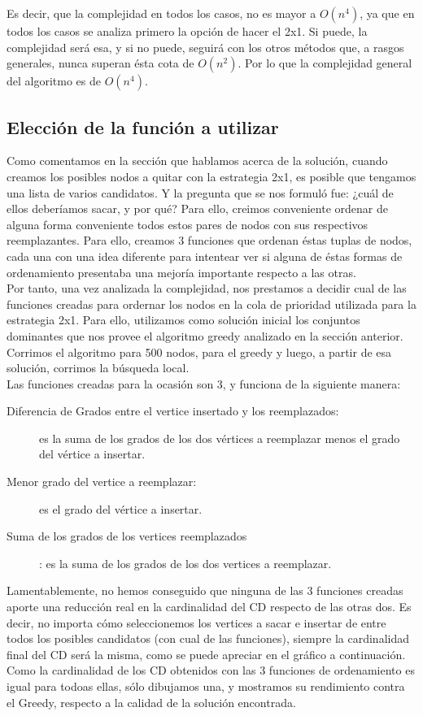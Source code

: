  Es decir, que la complejidad en todos los casos, no es mayor a $O(n^4)$, ya que en todos los casos se analiza primero la opción de hacer el 2x1. Si puede, la complejidad será esa, y si no puede, seguirá con los otros métodos que, a rasgos generales, nunca superan ésta cota de $O(n^2)$. Por lo que la complejidad general del algoritmo es de \textbf{$O(n^4)$}.
 
 \subsection{Elección de la función a utilizar}
Como comentamos en la sección que hablamos acerca de la solución, cuando creamos los posibles nodos a quitar con la estrategia 2x1, es posible que tengamos una lista de varios candidatos. Y la pregunta que se nos formuló fue: ¿cuál de ellos deberíamos sacar, y por qué? Para ello, creimos conveniente ordenar de alguna forma conveniente todos estos pares de nodos con sus respectivos reemplazantes. Para ello, creamos 3 funciones que ordenan éstas tuplas de nodos, cada una con una idea diferente para intentear ver si alguna de éstas formas de ordenamiento presentaba una mejoría importante respecto a las otras. \\
Por tanto, una vez analizada la complejidad, nos prestamos a decidir cual de las funciones creadas para ordernar los nodos en la cola de prioridad utilizada para la estrategia 2x1. Para ello, utilizamos como solución inicial los conjuntos dominantes que nos provee el algoritmo greedy analizado en la sección anterior. Corrimos el algoritmo para 500 nodos, para el greedy y luego, a partir de esa solución, corrimos la búsqueda local. \\
Las funciones creadas para la ocasión son 3, y funciona de la siguiente manera: 
\begin{description}
\item[Diferencia de Grados entre el vertice insertado y los reemplazados:] es la suma de los grados de los dos vértices a reemplazar menos el grado del vértice a insertar.
\item[Menor grado del vertice a reemplazar:] es el grado del vértice a insertar.
\item[Suma de los grados de los vertices reemplazados]: es la suma de los grados de los dos vertices a reemplazar.
\end{description}

Lamentablemente, no hemos conseguido que ninguna de las 3 funciones creadas aporte una reducción real en la cardinalidad del CD respecto de las otras dos. Es decir, no importa cómo seleccionemos los vertices a sacar e insertar de entre todos los posibles candidatos (con cual de las funciones), siempre la cardinalidad final del CD será la misma, como se puede apreciar en el gráfico a continuación. Como la cardinalidad de los CD obtenidos con las 3 funciones de ordenamiento es igual para todoas ellas, sólo dibujamos una, y mostramos su rendimiento contra el Greedy, respecto a la calidad de la solución encontrada. \\

